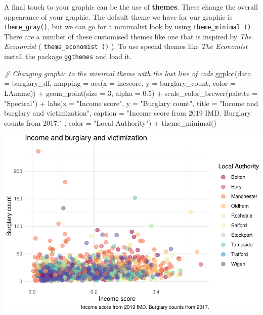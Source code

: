 \documentclass[
]{book}
\newenvironment{Shaded}{\begin{snugshade}}{\end{snugshade}}
\newcommand{\AttributeTok}[1]{\textcolor[rgb]{0.77,0.63,0.00}{#1}}
\newcommand{\CommentTok}[1]{\textcolor[rgb]{0.56,0.35,0.01}{\textit{#1}}}
\newcommand{\DecValTok}[1]{\textcolor[rgb]{0.00,0.00,0.81}{#1}}
\newcommand{\FloatTok}[1]{\textcolor[rgb]{0.00,0.00,0.81}{#1}}
\newcommand{\FunctionTok}[1]{\textcolor[rgb]{0.00,0.00,0.00}{#1}}
\newcommand{\NormalTok}[1]{#1}
\newcommand{\SpecialCharTok}[1]{\textcolor[rgb]{0.00,0.00,0.00}{#1}}
\newcommand{\StringTok}[1]{\textcolor[rgb]{0.31,0.60,0.02}{#1}}
\begin{document}
A final touch to your graphic can be the use of \textbf{themes}. These change the overall appearance of your graphic. The default theme we have for our graphic is \texttt{theme\_gray()}, but we can go for a minimalist look by using \texttt{theme\_minimal\ ()}. There are a number of these customised themes like one that is inspired by \emph{The Economist} ( \texttt{theme\_economist\ ()} ). To use special themes like \emph{The Economist} install the package \texttt{ggthemes} and load it.

\begin{Shaded}
\begin{Highlighting}[]
\CommentTok{\# Changing graphic to the minimal theme with the last line of code}
\FunctionTok{ggplot}\NormalTok{(}\AttributeTok{data =}\NormalTok{ burglary\_df, }\AttributeTok{mapping =} \FunctionTok{aes}\NormalTok{(}\AttributeTok{x =}\NormalTok{ incscore, }\AttributeTok{y =}\NormalTok{ burglary\_count, }\AttributeTok{color =}\NormalTok{ LAname)) }\SpecialCharTok{+} 
  \FunctionTok{geom\_point}\NormalTok{(}\AttributeTok{size =} \DecValTok{3}\NormalTok{, }\AttributeTok{alpha =} \FloatTok{0.5}\NormalTok{) }\SpecialCharTok{+} 
  \FunctionTok{scale\_color\_brewer}\NormalTok{(}\AttributeTok{palette =} \StringTok{"Spectral"}\NormalTok{) }\SpecialCharTok{+} 
  \FunctionTok{labs}\NormalTok{(}\AttributeTok{x =} \StringTok{"Income score"}\NormalTok{, }\AttributeTok{y =} \StringTok{"Burglary count"}\NormalTok{, }\AttributeTok{title =} \StringTok{"Income and burglary and victimization"}\NormalTok{, }\AttributeTok{caption =} \StringTok{"Income score from 2019 IMD. Burglary counts from 2017."}\NormalTok{ , }\AttributeTok{color =} \StringTok{"Local Authority"}\NormalTok{) }\SpecialCharTok{+} 
  \FunctionTok{theme\_minimal}\NormalTok{()}
\end{Highlighting}
\end{Shaded}

\includegraphics{03-data-visualisation_files/figure-latex/unnamed-chunk-12-1.pdf}
\end{document}
